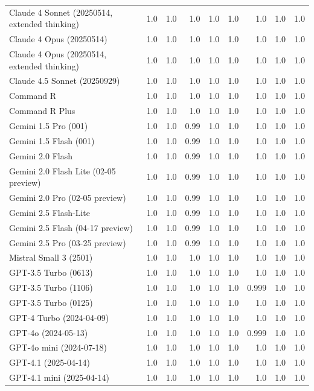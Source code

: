 \begin{table}[htp]
{\begin{tabular}{lrrrrrrrr}
Claude 4 Sonnet (20250514, extended thinking) & 1.0 & 1.0 & 1.0 & 1.0 & 1.0 & 1.0 & 1.0 & 1.0 \\
Claude 4 Opus (20250514) & 1.0 & 1.0 & 1.0 & 1.0 & 1.0 & 1.0 & 1.0 & 1.0 \\
Claude 4 Opus (20250514, extended thinking) & 1.0 & 1.0 & 1.0 & 1.0 & 1.0 & 1.0 & 1.0 & 1.0 \\
Claude 4.5 Sonnet (20250929) & 1.0 & 1.0 & 1.0 & 1.0 & 1.0 & 1.0 & 1.0 & 1.0 \\
Command R & 1.0 & 1.0 & 1.0 & 1.0 & 1.0 & 1.0 & 1.0 & 1.0 \\
Command R Plus & 1.0 & 1.0 & 1.0 & 1.0 & 1.0 & 1.0 & 1.0 & 1.0 \\
Gemini 1.5 Pro (001) & 1.0 & 1.0 & 0.99 & 1.0 & 1.0 & 1.0 & 1.0 & 1.0 \\
Gemini 1.5 Flash (001) & 1.0 & 1.0 & 0.99 & 1.0 & 1.0 & 1.0 & 1.0 & 1.0 \\
Gemini 2.0 Flash & 1.0 & 1.0 & 0.99 & 1.0 & 1.0 & 1.0 & 1.0 & 1.0 \\
Gemini 2.0 Flash Lite (02-05 preview) & 1.0 & 1.0 & 0.99 & 1.0 & 1.0 & 1.0 & 1.0 & 1.0 \\
Gemini 2.0 Pro (02-05 preview) & 1.0 & 1.0 & 0.99 & 1.0 & 1.0 & 1.0 & 1.0 & 1.0 \\
Gemini 2.5 Flash-Lite & 1.0 & 1.0 & 0.99 & 1.0 & 1.0 & 1.0 & 1.0 & 1.0 \\
Gemini 2.5 Flash (04-17 preview) & 1.0 & 1.0 & 0.99 & 1.0 & 1.0 & 1.0 & 1.0 & 1.0 \\
Gemini 2.5 Pro (03-25 preview) & 1.0 & 1.0 & 0.99 & 1.0 & 1.0 & 1.0 & 1.0 & 1.0 \\
Mistral Small 3 (2501) & 1.0 & 1.0 & 1.0 & 1.0 & 1.0 & 1.0 & 1.0 & 1.0 \\
GPT-3.5 Turbo (0613) & 1.0 & 1.0 & 1.0 & 1.0 & 1.0 & 1.0 & 1.0 & 1.0 \\
GPT-3.5 Turbo (1106) & 1.0 & 1.0 & 1.0 & 1.0 & 1.0 & 0.999 & 1.0 & 1.0 \\
GPT-3.5 Turbo (0125) & 1.0 & 1.0 & 1.0 & 1.0 & 1.0 & 1.0 & 1.0 & 1.0 \\
GPT-4 Turbo (2024-04-09) & 1.0 & 1.0 & 1.0 & 1.0 & 1.0 & 1.0 & 1.0 & 1.0 \\
GPT-4o (2024-05-13) & 1.0 & 1.0 & 1.0 & 1.0 & 1.0 & 0.999 & 1.0 & 1.0 \\
GPT-4o mini (2024-07-18) & 1.0 & 1.0 & 1.0 & 1.0 & 1.0 & 1.0 & 1.0 & 1.0 \\
GPT-4.1 (2025-04-14) & 1.0 & 1.0 & 1.0 & 1.0 & 1.0 & 1.0 & 1.0 & 1.0 \\
GPT-4.1 mini (2025-04-14) & 1.0 & 1.0 & 1.0 & 1.0 & 1.0 & 1.0 & 1.0 & 1.0 \\

\end{tabular}}
\end{table}
